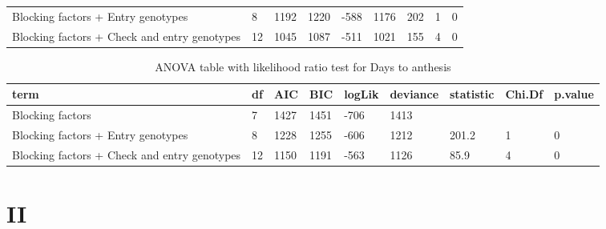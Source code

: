\documentclass[12pt,oneside]{dukestatscithesis} %
\theoremstyle{definition}
\theoremstyle{definition}
\theoremstyle{definition}
\theoremstyle{remark}
\begin{document}
\begin{table}[H]
\begin{tabular}[t]{>{\raggedright\arraybackslash}p{3.5cm}llllllll}
Blocking factors + Entry genotypes & 8 & 1192 & 1220 & -588 & 1176 & 202 & 1 & 0\\
Blocking factors + Check and entry genotypes & 12 & 1045 & 1087 & -511 & 1021 & 155 & 4 & 0\\
\bottomrule
\end{tabular}
\end{table}\begin{table}[H]
\caption{\label{tab:unnamed-chunk-5}\label{tab:lrt-dta}ANOVA table with likelihood ratio test for Days to anthesis}
\centering
\begin{tabular}[t]{>{\raggedright\arraybackslash}p{3.5cm}llllllll}
\toprule
term & df & AIC & BIC & logLik & deviance & statistic & Chi.Df & p.value\\
\midrule
Blocking factors & 7 & 1427 & 1451 & -706 & 1413 &  &  & \\
Blocking factors + Entry genotypes & 8 & 1228 & 1255 & -606 & 1212 & 201.2 & 1 & 0\\
Blocking factors + Check and entry genotypes & 12 & 1150 & 1191 & -563 & 1126 & 85.9 & 4 & 0\\
\bottomrule
\end{tabular}
\end{table}
\chapter{II}\label{ii}
\end{document}
